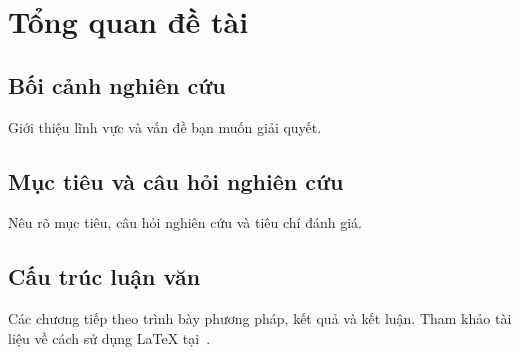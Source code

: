 \chapter{Tổng quan đề tài}
\section{Bối cảnh nghiên cứu}
Giới thiệu lĩnh vực và vấn đề bạn muốn giải quyết.
\section{Mục tiêu và câu hỏi nghiên cứu}
Nêu rõ mục tiêu, câu hỏi nghiên cứu và tiêu chí đánh giá.
\section{Cấu trúc luận văn}
Các chương tiếp theo trình bày phương pháp, kết quả và kết luận.
Tham khảo tài liệu về cách sử dụng LaTeX tại~\cite{latex}.
